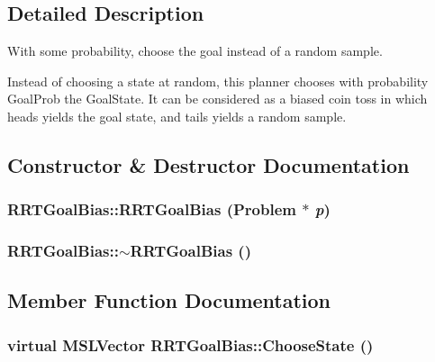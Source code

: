 \subsection{Detailed Description}
With some probability, choose the goal instead of a random sample.

Instead of choosing a state at random, this planner chooses with probability Goal\-Prob the Goal\-State. It can be considered as a  biased coin toss in which heads yields the goal state, and tails yields a random sample. 



\subsection{Constructor \& Destructor Documentation}
\subsubsection{\setlength{\rightskip}{0pt plus 5cm}RRTGoal\-Bias::RRTGoal\-Bias ({\bf Problem} $\ast$ {\em p})}\label{class_RRTGoalBias_a0}


\subsubsection{\setlength{\rightskip}{0pt plus 5cm}RRTGoal\-Bias::$\sim$RRTGoal\-Bias ()\hspace{0.3cm}{\tt  [inline, virtual]}}\label{class_RRTGoalBias_a1}




\subsection{Member Function Documentation}
\subsubsection{\setlength{\rightskip}{0pt plus 5cm}virtual {\bf MSLVector} RRTGoal\-Bias::Choose\-State ()\hspace{0.3cm}{\tt  [protected, virtual]}}\label{class_RRTGoalBias_b0}


